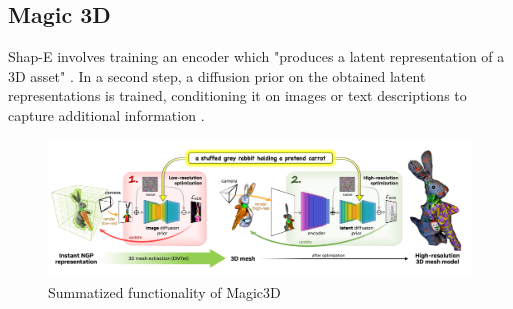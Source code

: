\subsection{Magic 3D}
\label{Magic3D}

Shap-E involves training an encoder which "produces a latent representation of a 3D asset" \citep{junShapeE}. In a second step, a diffusion prior on the obtained latent representations is trained, conditioning it on images or text descriptions to capture additional information \citep{junShapeE}.

\begin{figure}[ht]
    \centering
      \includegraphics[width=1\columnwidth]{figures/Magic3D.png}
      \caption{Summatized functionality of Magic3D}\label{fig:figureMagic3D}
\end{figure}